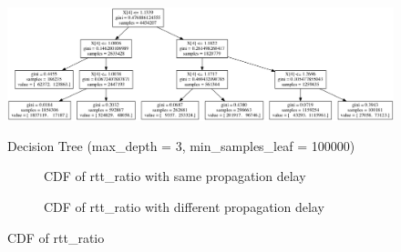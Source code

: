 \begin{figure}
\centering
  \includegraphics[width=\textwidth,height=4cm]{tree.png}
  \caption{Decision Tree (max\_depth = 3, min\_samples\_leaf = 100000)}
  \label{DT}
\end{figure}

\begin{figure}[!htb]\centering
   \begin{subfigure}{0.49\textwidth}
\caption{CDF of rtt\_ratio with same propagation delay}
\label{CDFrtt}

   \end{subfigure}
   \begin {subfigure}{0.49\textwidth}
\caption{CDF of rtt\_ratio with different propagation delay}
\label{CDFrttDiff}
   \end{subfigure}
\caption{CDF of rtt\_ratio}
\label{fig:cdf1}
\end{figure}





